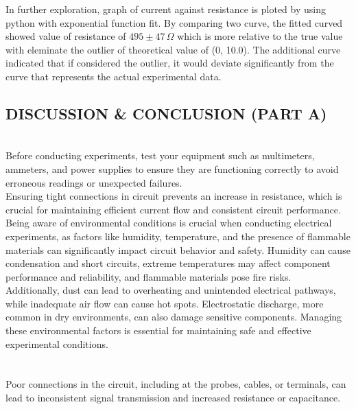 \documentclass[twocolumn,a4paper,11pt]{article}
\begin{document}
In further exploration, graph of current against resistance is ploted by using python with exponential function fit. By comparing two curve, the fitted curved showed value of resistance of $495 \pm 47 \,\Omega$ which is more relative to the true value with eleminate the outlier of theoretical value of (0, 10.0). The additional curve indicated that if considered the outlier, it would deviate significantly from the curve that represents the actual experimental data.
\subsection*{DISCUSSION \& CONCLUSION (PART A)}
 \\

Before conducting experiments, test your equipment such as multimeters, ammeters, and power supplies to ensure they are functioning correctly to avoid erroneous readings or unexpected failures.\\

Ensuring tight connections in circuit prevents an increase in resistance, which is crucial for maintaining efficient current flow and consistent circuit performance.\\

Being aware of environmental conditions is crucial when conducting electrical experiments, as factors like humidity, temperature, and the presence of flammable materials can significantly impact circuit behavior and safety. Humidity can cause condensation and short circuits, extreme temperatures may affect component performance and reliability, and flammable materials pose fire risks. \\

Additionally, dust can lead to overheating and unintended electrical pathways, while inadequate air flow can cause hot spots. Electrostatic discharge, more common in dry environments, can also damage sensitive components. Managing these environmental factors is essential for maintaining safe and effective experimental conditions.\\
\\
\\

Poor connections in the circuit, including at the probes, cables, or terminals, can lead to inconsistent signal transmission and increased resistance or capacitance.\\
\end{document}
